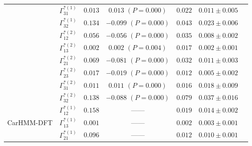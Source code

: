 \documentclass{article}
\begin{document}
\begin{center}
{\begin{tabular}{ccccccc}
                             & $\Gamma^{*(1)}_{31}$          & $0.013$                         & $0.013$ $(P=0.000)$        & $0.022$                           & $0.011 \pm 0.005$                             \\
                             & $\Gamma^{*(1)}_{32}$          & $0.134$                         & $-0.099$ $(P=0.000)$        & $0.043$                           & $0.023 \pm 0.006$                             \\
                             & $\Gamma^{*(2)}_{12}$          & $0.056$                         & $-0.056$ $(P=0.000)$        & $0.035$                           & $0.008 \pm 0.002$                             \\
                             & $\Gamma^{*(2)}_{13}$          & $0.002$                         & $0.002$ $(P=0.004)$        & $0.017$                           & $0.002 \pm 0.001$                             \\
                             & $\Gamma^{*(2)}_{21}$          & $0.069$                         & $-0.081$ $(P=0.000)$        & $0.032$                           & $0.011 \pm 0.003$                             \\
                             & $\Gamma^{*(2)}_{23}$          & $0.017$                         & $-0.019$ $(P=0.000)$        & $0.012$                           & $0.005 \pm 0.002$                             \\
                             & $\Gamma^{*(2)}_{31}$          & $0.011$                         & $0.011$ $(P=0.000)$        & $0.016$                           & $0.018 \pm 0.009$                             \\
                             & $\Gamma^{*(2)}_{32}$          & $0.138$                         & $-0.088$ $(P=0.000)$        & $0.079$                           & $0.037 \pm 0.016$                             \\ \hline
\multirow{6}{*}{CarHMM-DFT}  & $\Gamma^{*(1)}_{12}$          & $0.158$                         & ------                   & $0.019$                           & $0.014 \pm 0.002$                             \\
                             & $\Gamma^{*(1)}_{13}$          & $0.001$                         & ------                   & $0.002$                           & $0.003 \pm 0.001$                             \\
                             & $\Gamma^{*(1)}_{21}$          & $0.096$                         & ------                   & $0.012$                           & $0.010 \pm 0.001$                             \\

\end{tabular}}
\end{center}
\end{document}
